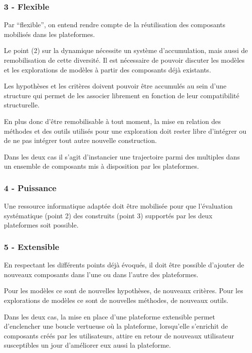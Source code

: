 
\subsubsection{3 - Flexible}

Par \enquote{flexible}, on entend rendre compte de la réutilisation des composants mobilisés dans les plateformes. 

Le point (2) sur la dynamique nécessite un système d'accumulation, mais aussi de remobilisation de cette diversité. Il est nécessaire de pouvoir discuter les modèles et les explorations de modèles à partir des composants déjà existants.

Les hypothèses et les critères doivent pouvoir être accumulés au sein d'une structure qui permet de les associer librement en fonction de leur compatibilité structurelle. 

En plus donc d'être remobilisable à tout moment, la mise en relation des méthodes et des outils utilisés pour une exploration doit rester libre d'intégrer ou de ne pas intégrer tout autre nouvelle construction.

Dans les deux cas il s'agit d'instancier une trajectoire parmi des multiples dans un ensemble de composants mis à disposition par les plateformes.

\subsubsection{4 - Puissance}

Une ressource informatique adaptée doit être mobilisée pour que l'évaluation systématique (point 2) des construits (point 3) supportés par les deux plateformes  soit possible.

\subsubsection{5 - Extensible}

En respectant les différents points déjà évoqués, il doit être possible d'ajouter de nouveaux composants dans l'une ou dans l'autre des plateformes.

Pour les modèles ce sont de nouvelles hypothèses, de nouveaux critères. Pour les explorations de modèles ce sont de nouvelles méthodes, de nouveaux outils.

Dans les deux cas, la mise en place d'une plateforme extensible permet d'enclencher une boucle vertueuse où la plateforme, lorsqu'elle s'enrichit de composants créés par les utilisateurs, attire en retour de nouveaux utilisateur susceptibles un jour d'améliorer eux aussi la plateforme.

